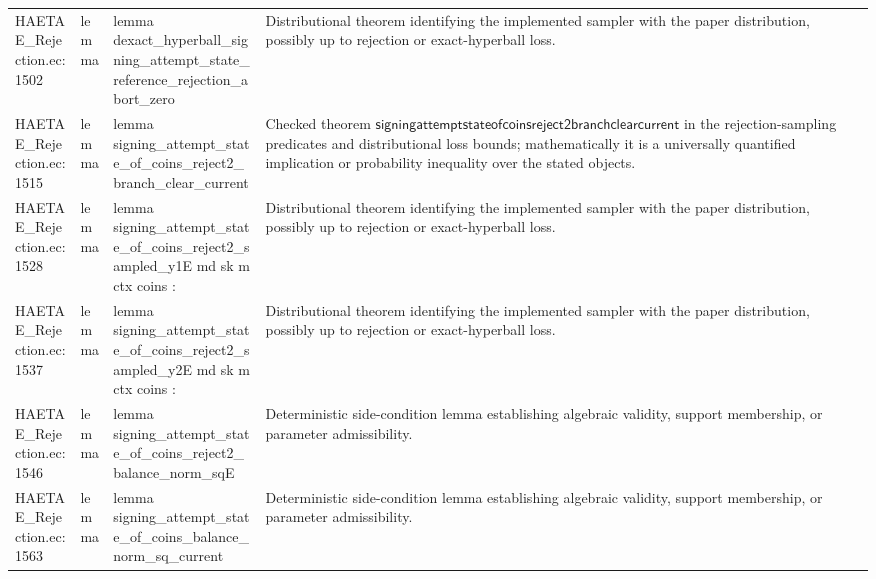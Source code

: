 \documentclass[10pt]{article}
\begin{document}
\begin{longtable}{L{0.11\textwidth}L{0.055\textwidth}L{0.385\textwidth}L{0.41\textwidth}}
HAETAE\_\allowbreak{}Rejection.\allowbreak{}ec:\allowbreak{}1502 & lemma & {\ttfamily\scriptsize lemma dexact\_\allowbreak{}hyperball\_\allowbreak{}signing\_\allowbreak{}attempt\_\allowbreak{}state\_\allowbreak{}reference\_\allowbreak{}rejection\_\allowbreak{}abort\_\allowbreak{}zero} & Distributional theorem identifying the implemented sampler with the paper distribution, possibly up to rejection or exact-hyperball loss. \\
HAETAE\_\allowbreak{}Rejection.\allowbreak{}ec:\allowbreak{}1515 & lemma & {\ttfamily\scriptsize lemma signing\_\allowbreak{}attempt\_\allowbreak{}state\_\allowbreak{}of\_\allowbreak{}coins\_\allowbreak{}reject2\_\allowbreak{}branch\_\allowbreak{}clear\_\allowbreak{}current} & Checked theorem $\mathsf{signingattemptstateofcoinsreject2branchclearcurrent}$ in the rejection-sampling predicates and distributional loss bounds; mathematically it is a universally quantified implication or probability inequality over the stated objects. \\
HAETAE\_\allowbreak{}Rejection.\allowbreak{}ec:\allowbreak{}1528 & lemma & {\ttfamily\scriptsize lemma signing\_\allowbreak{}attempt\_\allowbreak{}state\_\allowbreak{}of\_\allowbreak{}coins\_\allowbreak{}reject2\_\allowbreak{}sampled\_\allowbreak{}y1E md sk m ctx coins :} & Distributional theorem identifying the implemented sampler with the paper distribution, possibly up to rejection or exact-hyperball loss. \\
HAETAE\_\allowbreak{}Rejection.\allowbreak{}ec:\allowbreak{}1537 & lemma & {\ttfamily\scriptsize lemma signing\_\allowbreak{}attempt\_\allowbreak{}state\_\allowbreak{}of\_\allowbreak{}coins\_\allowbreak{}reject2\_\allowbreak{}sampled\_\allowbreak{}y2E md sk m ctx coins :} & Distributional theorem identifying the implemented sampler with the paper distribution, possibly up to rejection or exact-hyperball loss. \\
HAETAE\_\allowbreak{}Rejection.\allowbreak{}ec:\allowbreak{}1546 & lemma & {\ttfamily\scriptsize lemma signing\_\allowbreak{}attempt\_\allowbreak{}state\_\allowbreak{}of\_\allowbreak{}coins\_\allowbreak{}reject2\_\allowbreak{}balance\_\allowbreak{}norm\_\allowbreak{}sqE} & Deterministic side-condition lemma establishing algebraic validity, support membership, or parameter admissibility. \\
HAETAE\_\allowbreak{}Rejection.\allowbreak{}ec:\allowbreak{}1563 & lemma & {\ttfamily\scriptsize lemma signing\_\allowbreak{}attempt\_\allowbreak{}state\_\allowbreak{}of\_\allowbreak{}coins\_\allowbreak{}balance\_\allowbreak{}norm\_\allowbreak{}sq\_\allowbreak{}current} & Deterministic side-condition lemma establishing algebraic validity, support membership, or parameter admissibility. \\

\end{longtable}
\end{document}
